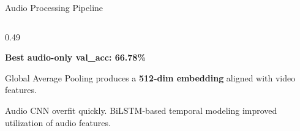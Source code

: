 \documentclass[aspectratio=169, 10pt]{beamer}
\begin{document}
\begin{frame}{Audio Processing Pipeline}
\begin{columns}[T,onlytextwidth]
\begin{column}{0.49\textwidth}
\begin{tcolorbox}[
tealcard,
title={\small Step 3 --- ResNet-18 Audio CNN},
boxsep=2pt,
left=3pt,right=3pt,
top=3pt,bottom=3pt]
\textbf{Best audio-only val\_acc: 66.78\%}

\end{tcolorbox}

\vspace{2pt}

\begin{tcolorbox}[
tealcard,
title={\small Step 4 --- Audio Embedding},
boxsep=2pt,
left=3pt,right=3pt,
top=3pt,bottom=3pt]

\footnotesize
Global Average Pooling produces a \textbf{512-dim embedding} aligned with video features.

\end{tcolorbox}

\vspace{2pt}

\begin{tcolorbox}[
purplecard,
title={\small Training Observation},
boxsep=2pt,
left=3pt,right=3pt,
top=3pt,bottom=3pt]

\footnotesize
Audio CNN overfit quickly.
BiLSTM-based temporal modeling improved utilization of audio features.

\end{tcolorbox}

\end{column}

\end{columns}
\end{frame}
\end{document}
